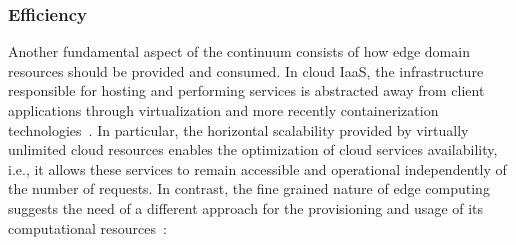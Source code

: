 

\subsubsection*{Efficiency}

Another fundamental aspect of the continuum consists of how edge domain resources should be provided and consumed. In cloud IaaS, the infrastructure responsible for hosting and performing services is abstracted away from client applications through virtualization and more recently containerization technologies~\cite{Quatrocchi2016discrete}. In particular, the horizontal scalability provided by virtually unlimited cloud resources enables the optimization of cloud services availability, i.e., it allows these services to remain accessible and operational independently of the number of requests. In contrast, the fine grained nature of edge computing suggests the need of a different approach for the provisioning and usage of its computational resources~\cite{GarrigaMendonca2017}: 






